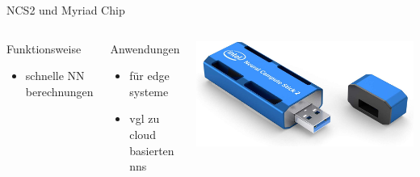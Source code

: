\begin{frame}{NCS2 und Myriad Chip}

    \begin{columns}[T]
        \begin{block}{Funktionsweise}
            \begin{itemize}
                \item schnelle NN berechnungen
            \end{itemize}
        \end{block}
    
        \begin{block}{Anwendungen}
            \begin{itemize}
                \item für edge systeme
                \item vgl zu cloud basierten nns
            \end{itemize}
        \end{block}

        \includegraphics[width=\textwidth]{Bilder/ncs2.jpg}


        
    \end{columns}


    
\end{frame}


